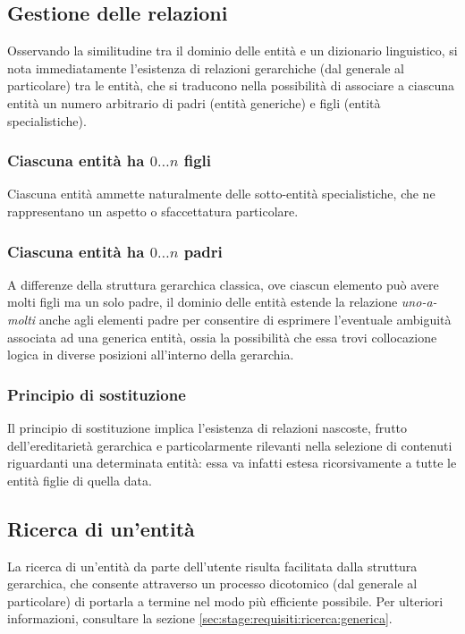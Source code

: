 \documentclass[10pt,a4paper,headinclude,footinclude,hidelinks]{scrreprt} %
\begin{document}
	\subsection{Gestione delle relazioni}
	\label{sec:stage:requisiti:entità:relazioni}

	Osservando la similitudine tra il dominio delle entità e un dizionario linguistico, si nota immediatamente l'esistenza di relazioni gerarchiche (dal generale al particolare) tra le entità, che si traducono nella possibilità di associare a ciascuna entità un numero arbitrario di padri (entità generiche) e figli (entità specialistiche).


	\subsubsection{Ciascuna entit\`a ha $0\ldots n$ figli}
	Ciascuna entità ammette naturalmente delle sotto-entità specialistiche, che ne rappresentano un aspetto o sfaccettatura particolare.
	\subsubsection{Ciascuna entit\`a ha $0\ldots n$ padri}
	A differenze della struttura gerarchica classica, ove ciascun elemento può avere molti figli ma un solo padre, il dominio delle entità estende la relazione \textit{uno-a-molti} anche agli elementi padre per consentire di esprimere l'eventuale ambiguità associata ad una generica entità, ossia la possibilità che essa trovi collocazione logica in diverse posizioni all'interno della gerarchia.
	\subsubsection{Principio di sostituzione}
	Il principio di sostituzione implica l'esistenza di relazioni nascoste, frutto dell'ereditarietà gerarchica e particolarmente rilevanti nella selezione di contenuti riguardanti una determinata entità: essa va infatti estesa ricorsivamente a tutte le entità figlie di quella data.   
	\subsection{Ricerca di un'entit\`a}
	La ricerca di un'entità da parte dell'utente risulta facilitata dalla struttura gerarchica, che consente attraverso un processo dicotomico (dal generale al particolare) di portarla a termine nel modo più efficiente possibile. Per ulteriori informazioni, consultare la sezione \ref{sec:stage:requisiti:ricerca:generica}. 
\end{document}
